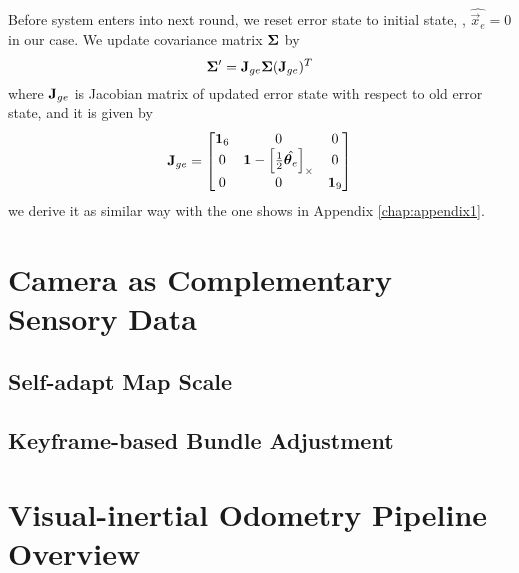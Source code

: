 Before system enters into next round, we reset error state to initial state, \ie, $\hat{\vec{x}_e} = 0$ in our case. We update covariance matrix $\mathbf{\Sigma}$ by
\begin{equation}\label{f20}
	\mathbf{\Sigma}^\prime = \mathbf{J}_{ge} \mathbf{\Sigma} (\mathbf{J}_{ge})^T
\end{equation}
where $\mathbf{J}_{ge}$ is Jacobian matrix of updated error state with respect to old error state, and it is given by
\begin{equation}\label{f21}
	\mathbf{J}_{ge} = \begin{bmatrix}
	\mathbf{1}_6 & 0 & 0 \\
	0 & \mathbf{1} - \left[ \frac{1}{2} \hat{\boldsymbol{\theta}_e} \right]_\times & 0 \\
	0 & 0 & \mathbf{1}_9 \\
	\end{bmatrix}
\end{equation}
we derive it as similar way with the one shows in Appendix \ref{chap:appendix1}.

\section{Camera as Complementary Sensory Data}
\label{sec:camera_comple_data}




\subsection{Self-adapt Map Scale}
\label{subsec:camera_comple_data_sub2}

\subsection{Keyframe-based Bundle Adjustment}
\label{subsec:camera_comple_data_sub3}

\section{Visual-inertial Odometry Pipeline Overview}
\label{sec:pipeline_overview}
